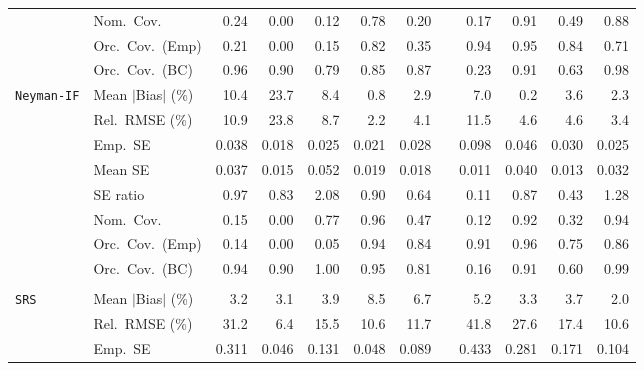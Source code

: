 \begin{landscape}
\begin{longtable}{llrrrrrrrrrr}
 & Nom.\ Cov. & 0.24 & 0.00 & 0.12 & \cellcolor{rankthree}0.78 & 0.20 &  & 0.17 & \cellcolor{rankone}0.91 & 0.49 & \cellcolor{ranktwo}0.88 \\
 & Orc.\ Cov.\ (Emp) & 0.21 & 0.00 & 0.15 & 0.82 & 0.35 &  & \cellcolor{ranktwo}0.94 & \cellcolor{rankone}0.95 & \cellcolor{rankthree}0.84 & 0.71 \\
 & Orc.\ Cov.\ (BC) & \cellcolor{rankone}0.96 & 0.90 & 0.79 & 0.85 & 0.87 &  & 0.23 & \cellcolor{rankthree}0.91 & 0.63 & \cellcolor{ranktwo}0.98 \\
\addlinespace[2pt]
\quad \texttt{Neyman-IF} & Mean $|$Bias$|$ (\%) & 10.4 & 23.7 & 8.4 & \cellcolor{ranktwo}0.8 & 2.9 &  & 7.0 & \cellcolor{rankone}0.2 & 3.6 & \cellcolor{rankthree}2.3 \\
 & Rel.\ RMSE (\%) & 10.9 & 23.8 & 8.7 & \cellcolor{rankone}2.2 & \cellcolor{rankthree}4.1 &  & 11.5 & 4.6 & 4.6 & \cellcolor{ranktwo}3.4 \\
 & Emp.\ SE & 0.038 & 0.018 & 0.025 & 0.021 & 0.028 &  & 0.098 & 0.046 & 0.030 & 0.025 \\
 & Mean SE & 0.037 & 0.015 & 0.052 & 0.019 & 0.018 &  & 0.011 & 0.040 & 0.013 & 0.032 \\
 & SE ratio & \cellcolor{rankone}0.97 & 0.83 & 2.08 & \cellcolor{ranktwo}0.90 & 0.64 &  & 0.11 & \cellcolor{rankthree}0.87 & 0.43 & 1.28 \\
 & Nom.\ Cov. & 0.15 & 0.00 & \cellcolor{rankthree}0.77 & \cellcolor{rankone}0.96 & 0.47 &  & 0.12 & \cellcolor{ranktwo}0.92 & 0.32 & \cellcolor{rankone}0.94 \\
 & Orc.\ Cov.\ (Emp) & 0.14 & 0.00 & 0.05 & \cellcolor{rankone}0.94 & 0.84 &  & \cellcolor{ranktwo}0.91 & \cellcolor{rankone}0.96 & 0.75 & \cellcolor{rankthree}0.86 \\
 & Orc.\ Cov.\ (BC) & \cellcolor{ranktwo}0.94 & 0.90 & 1.00 & \cellcolor{rankone}0.95 & 0.81 &  & 0.16 & \cellcolor{rankthree}0.91 & 0.60 & \cellcolor{rankthree}0.99 \\
\addlinespace[2pt]
\multicolumn{12}{l}{\textbf{Binary \& Categorical Phase-One Covariates}} \\
\addlinespace[2pt]
\quad \texttt{SRS} & Mean $|$Bias$|$ (\%) & \cellcolor{rankthree}3.2 & \cellcolor{ranktwo}3.1 & 3.9 & 8.5 & 6.7 &  & 5.2 & 3.3 & 3.7 & \cellcolor{rankone}2.0 \\
 & Rel.\ RMSE (\%) & 31.2 & \cellcolor{rankone}6.4 & 15.5 & \cellcolor{ranktwo}10.6 & \cellcolor{rankthree}11.7 &  & 41.8 & 27.6 & 17.4 & \cellcolor{ranktwo}10.6 \\
 & Emp.\ SE & 0.311 & 0.046 & 0.131 & 0.048 & 0.089 &  & 0.433 & 0.281 & 0.171 & 0.104 \\

\end{longtable}
\end{landscape}
